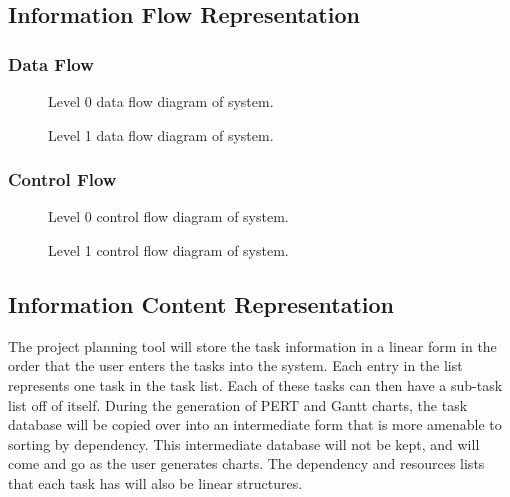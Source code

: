 %
%
\subsection{Information Flow Representation}

%
%
\subsubsection{Data Flow}

\begin{figure}
\centering
\centerline{}
\caption[Level 0 Data Flow Diagram of System]{\label{l0-dfd} 
Level 0 data flow diagram of system.}
\end{figure}

\begin{figure}
\centering
\centerline{}
\caption[Level 1 Data Flow Diagram of System]{\label{l1-dfd} 
Level 1 data flow diagram of system.}
\end{figure}

%
%
\subsubsection{Control Flow}

\begin{figure}
\centering
\centerline{}
\caption[Level 0 Control Flow Diagram of System]{\label{l0-cfd} 
Level 0 control flow diagram of system.}
\end{figure}

\begin{figure}
\centering
\centerline{}
\caption[Level 1 Control Flow Diagram of System]{\label{l1-cfd} 
Level 1 control flow diagram of system.}
\end{figure}

\subsection{Information Content Representation}

The project planning tool will store the task information in a linear
form in the order that the user enters the tasks into the system.
Each entry in the list represents one task in the task list.  Each of
these tasks can then have a sub-task list off of itself.  During the
generation of PERT and Gantt charts, the task database will be copied
over into an intermediate form that is more amenable to sorting by
dependency.  This intermediate database will not be kept, and will
come and go as the user generates charts.  The dependency and
resources lists that each task has will also be linear structures.

